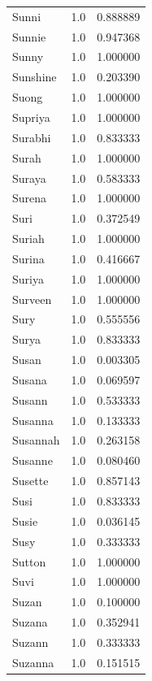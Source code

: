 \documentclass[
  letterpaper,
  DIV=11,
  numbers=noendperiod]{scrreprt}
\begin{document}
\begin{tabular}{lrr}
Sunni           &   1.0 &   0.888889 \\
Sunnie          &   1.0 &   0.947368 \\
Sunny           &   1.0 &   1.000000 \\
Sunshine        &   1.0 &   0.203390 \\
Suong           &   1.0 &   1.000000 \\
Supriya         &   1.0 &   1.000000 \\
Surabhi         &   1.0 &   0.833333 \\
Surah           &   1.0 &   1.000000 \\
Suraya          &   1.0 &   0.583333 \\
Surena          &   1.0 &   1.000000 \\
Suri            &   1.0 &   0.372549 \\
Suriah          &   1.0 &   1.000000 \\
Surina          &   1.0 &   0.416667 \\
Suriya          &   1.0 &   1.000000 \\
Surveen         &   1.0 &   1.000000 \\
Sury            &   1.0 &   0.555556 \\
Surya           &   1.0 &   0.833333 \\
Susan           &   1.0 &   0.003305 \\
Susana          &   1.0 &   0.069597 \\
Susann          &   1.0 &   0.533333 \\
Susanna         &   1.0 &   0.133333 \\
Susannah        &   1.0 &   0.263158 \\
Susanne         &   1.0 &   0.080460 \\
Susette         &   1.0 &   0.857143 \\
Susi            &   1.0 &   0.833333 \\
Susie           &   1.0 &   0.036145 \\
Susy            &   1.0 &   0.333333 \\
Sutton          &   1.0 &   1.000000 \\
Suvi            &   1.0 &   1.000000 \\
Suzan           &   1.0 &   0.100000 \\
Suzana          &   1.0 &   0.352941 \\
Suzann          &   1.0 &   0.333333 \\
Suzanna         &   1.0 &   0.151515 \\

\end{tabular}
\end{document}
